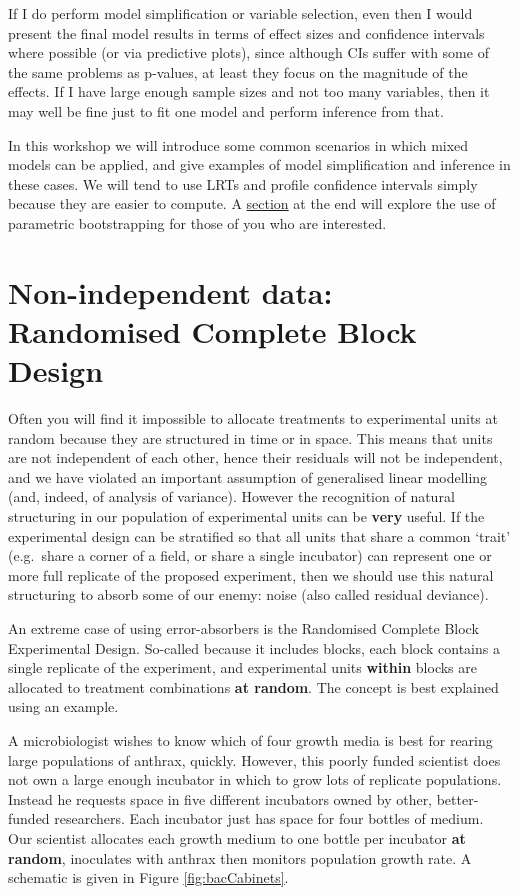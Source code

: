 \documentclass[]{book}
\theoremstyle{definition}
\theoremstyle{definition}
\theoremstyle{definition}
\theoremstyle{remark}
\begin{document}
If I do perform model simplification or variable selection, even then I
would present the final model results in terms of effect sizes and
confidence intervals where possible (or via predictive plots), since
although CIs suffer with some of the same problems as p-values, at least
they focus on the magnitude of the effects. If I have large enough
sample sizes and not too many variables, then it may well be fine just
to fit one model and perform inference from that.

In this workshop we will introduce some common scenarios in which mixed
models can be applied, and give examples of model simplification and
inference in these cases. We will tend to use LRTs and profile
confidence intervals simply because they are easier to compute. A
\protect\hyperlink{parboot}{section} at the end will explore the use of
parametric bootstrapping for those of you who are interested.

\section{Non-independent data: Randomised Complete Block
Design}\label{non-independent-data-randomised-complete-block-design}

Often you will find it impossible to allocate treatments to experimental
units at random because they are structured in time or in space. This
means that units are not independent of each other, hence their
residuals will not be independent, and we have violated an important
assumption of generalised linear modelling (and, indeed, of analysis of
variance). However the recognition of natural structuring in our
population of experimental units can be \textbf{very} useful. If the
experimental design can be stratified so that all units that share a
common `trait' (e.g.~share a corner of a field, or share a single
incubator) can represent one or more full replicate of the proposed
experiment, then we should use this natural structuring to absorb some
of our enemy: noise (also called residual deviance).

An extreme case of using error-absorbers is the Randomised Complete
Block Experimental Design. So-called because it includes blocks, each
block contains a single replicate of the experiment, and experimental
units \textbf{within} blocks are allocated to treatment combinations
\textbf{at random}. The concept is best explained using an example.

A microbiologist wishes to know which of four growth media is best for
rearing large populations of anthrax, quickly. However, this poorly
funded scientist does not own a large enough incubator in which to grow
lots of replicate populations. Instead he requests space in five
different incubators owned by other, better-funded researchers. Each
incubator just has space for four bottles of medium. Our scientist
allocates each growth medium to one bottle per incubator \textbf{at
random}, inoculates with anthrax then monitors population growth rate. A
schematic is given in Figure \ref{fig:bacCabinets}.
\end{document}
